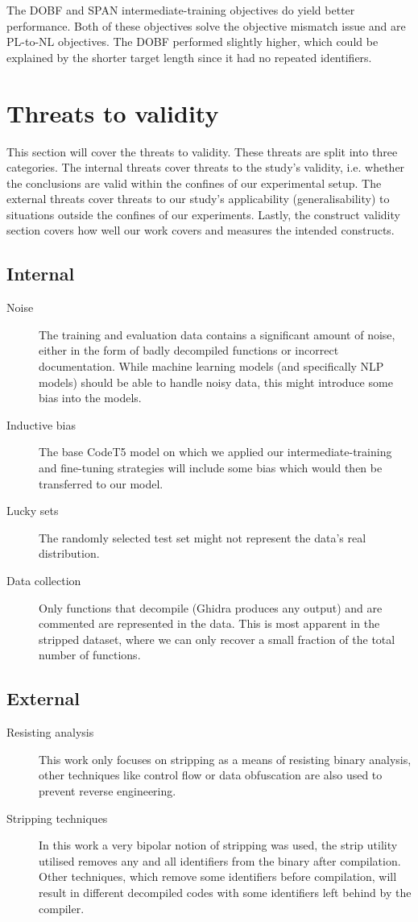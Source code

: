 The DOBF and SPAN intermediate-training objectives do yield better performance. Both of these objectives solve the objective mismatch issue and are PL-to-NL objectives. The DOBF performed slightly higher, which could be explained by the shorter target length since it had no repeated identifiers.

\section{Threats to validity}

This section will cover the threats to validity. These threats are split into three categories. The internal threats cover threats to the study's validity, i.e. whether the conclusions are valid within the confines of our experimental setup. The external threats cover threats to our study's applicability (generalisability) to situations outside the confines of our experiments. Lastly, the construct validity section covers how well our work covers and measures the intended constructs.
\subsection{Internal}
    \begin{description}
        \item[Noise] The training and evaluation data contains a significant amount of noise, either in the form of badly decompiled functions or incorrect documentation. While machine learning models (and specifically NLP models) should be able to handle noisy data, this might introduce some bias into the models.
        \item[Inductive bias] The base CodeT5 model on which we applied our intermediate-training and fine-tuning strategies will include some bias which would then be transferred to our model.
        \item[Lucky sets] The randomly selected test set might not represent the data's real distribution.
        \item[Data collection] Only functions that decompile (Ghidra produces any output) and are commented are represented in the data. This is most apparent in the stripped dataset, where we can only recover a small fraction of the total number of functions. 
    \end{description}
\subsection{External}
    \begin{description}
        \item[Resisting analysis] This work only focuses on stripping as a means of resisting binary analysis, other techniques like control flow or data obfuscation are also used to prevent reverse engineering. 
        \item[Stripping techniques] In this work a very bipolar notion of stripping was used, the strip utility utilised removes any and all identifiers from the binary after compilation. Other techniques, which remove some identifiers before compilation, will result in different decompiled codes with some identifiers left behind by the compiler. 
    \end{description}
